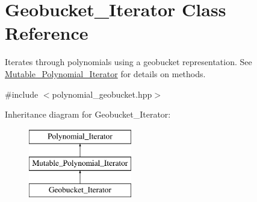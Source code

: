 \hypertarget{class_geobucket___iterator}{}\section{Geobucket\+\_\+\+Iterator Class Reference}
\label{class_geobucket___iterator}


Iterates through polynomials using a geobucket representation. See \hyperlink{class_mutable___polynomial___iterator}{Mutable\+\_\+\+Polynomial\+\_\+\+Iterator} for details on methods.  




{\ttfamily \#include $<$polynomial\+\_\+geobucket.\+hpp$>$}

Inheritance diagram for Geobucket\+\_\+\+Iterator\+:\begin{figure}[H]
\begin{center}
\leavevmode
\includegraphics[height=3.000000cm]{class_geobucket___iterator}
\end{center}
\end{figure}
